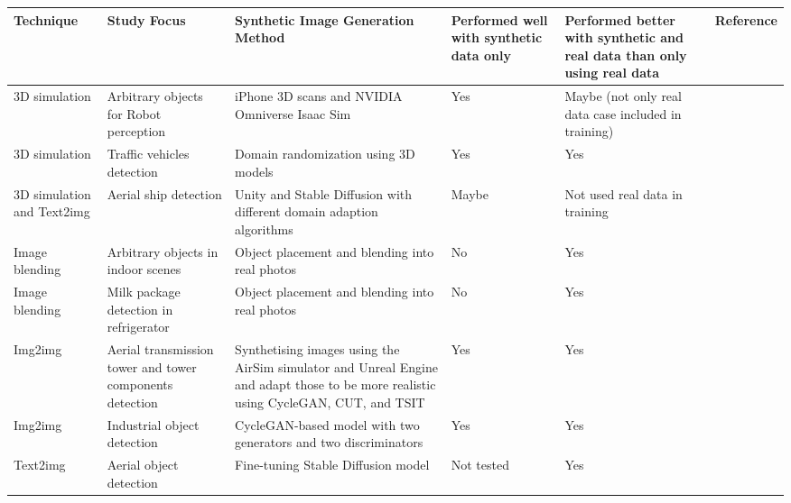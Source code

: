 \begin{table}[h!]
    \centering
    \scriptsize
    \begin{tabular}{p{2cm}|p{3cm}|p{3cm}|p{2cm}|p{2cm}|p{1.5cm}}
    \hline
    \textbf{Technique} & \textbf{Study Focus} & \textbf{Synthetic Image Generation Method} & \textbf{Performed well with synthetic data only} & \textbf{Performed better with synthetic and real data than only using real data} & \textbf{Reference} \\ \hline \hline
    3D simulation & Arbitrary objects for Robot perception & iPhone 3D scans and NVIDIA Omniverse Isaac Sim & Yes & Maybe (not only real data case included in training) & \cite{singh2024syntheticalargescalesynthetic}\\ \hline

    3D simulation & Traffic vehicles detection & Domain randomization using 3D models & Yes & Yes & \cite{tremblay2018trainingdeepnetworkssynthetic} \\ \hline

    3D simulation and Text2img & Aerial ship detection & Unity and Stable Diffusion with different domain adaption algorithms & Maybe & Not used real data in training & \cite{app14114558} \\ \hline

    Image blending & Arbitrary objects in indoor scenes & Object placement and blending into real photos & No & Yes & \cite{georgakis2017synthesizingtrainingdataobject} \\ \hline

    Image blending & Milk package detection in refrigerator & Object placement and blending into real photos & No & Yes & \cite{Bartolovic2024FromST} \\ \hline

    Img2img & Aerial transmission tower and tower components detection & Synthetising images using the AirSim simulator and Unreal Engine and adapt those to be more realistic using CycleGAN, CUT, and TSIT & Yes & Yes & \cite{Peterlevitz2023SimtoRealTF} \\ \hline

    Img2img & Industrial object detection & CycleGAN-based model with two generators and two discriminators & Yes & Yes & \cite{math11224588} \\ \hline

    Text2img & Aerial object detection & Fine-tuning Stable Diffusion model & Not tested & Yes & \cite{jian2023stablediffusionaerialobject} \\ \hline


\end{tabular}
\end{table}

